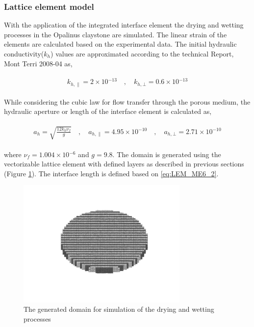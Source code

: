 \subsubsection*{Lattice element model}

With the application of the integrated interface element \cite{Sattarietal2019b} the drying and wetting processes in the Opalinus claystone are simulated. The linear strain of the elements are calculated based on the experimental data. The initial hydraulic conductivity($k_h$) values are approximated according to the technical Report, Mont Terri 2008-04 as,

\begin{align}
\label{eq:LEM_ME6_1}
\begin{split}
k_{h,\parallel}=2\times{10}{^{-13}}
\quad , \quad
k_{h,\bot}=0.6\times{10}{^{-13}}
\end{split}
\end{align}

While considering the cubic law for flow transfer through the porous medium, the hydraulic aperture or length of the interface element is calculated as,

\begin{align}
\label{eq:LEM_ME6_2}
\begin{split}
a_h=\sqrt{\frac{12k_h\nu_f}{g}}
\quad , \quad
a_{h,\parallel}=4.95\times{10}{^{-10}}
\quad , \quad
a_{h,\bot}=2.71\times{10}{^{-10}}
\end{split}
\end{align}

where $\nu_f=1.004\times{10}{^{-6}}$ and $g=9.8$. The domain is generated using the vectorizable lattice element with defined layers as described in previous sections (Figure \ref{fig:Amir_ME6_Lattice_Setup}). The interface length is defined based on \ref{eq:LEM_ME6_2}.

\begin{figure}[!ht]
\centering
\includegraphics[width=0.75\textwidth]{figures/Amir_ME6_Lattice_Setup.png}
\caption{The generated domain for simulation of the drying and wetting processes}
\label{fig:Amir_ME6_Lattice_Setup}
\end{figure} 


